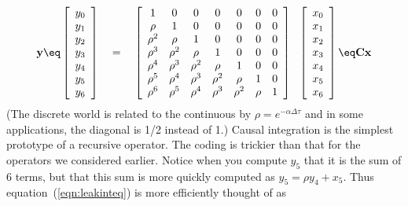 \begin{equation}
\bold y \eq
  \left[
        \begin{array}{c}
                y_0 \\
                y_1 \\
                y_2 \\
                y_3 \\
                y_4 \\
                y_5 \\
                y_6 
        \end{array}
  \right]
 \quad = \quad
  \left[
        \begin{array}{cccccccc}
             1 &     0 &     0 &     0 &     0 &     0 &     0 \\
        \rho   &     1 &     0 &     0 &     0 &     0 &     0 \\
        \rho^2 &\rho   &     1 &     0 &     0 &     0 &     0 \\
        \rho^3 &\rho^2 &\rho   &     1 &     0 &     0 &     0 \\
        \rho^4 &\rho^3 &\rho^2 &\rho   &     1 &     0 &     0 \\
        \rho^5 &\rho^4 &\rho^3 &\rho^2 &\rho   &     1 &     0 \\
        \rho^6 &\rho^5 &\rho^4 &\rho^3 &\rho^2 &\rho   &     1 
        \end{array}
  \right]
  \ \ 
  \left[
        \begin{array}{c}
                x_0 \\
                x_1 \\
                x_2 \\
                x_3 \\
                x_4 \\
                x_5 \\
                x_6 
        \end{array}
  \right]
\eq \bold C \bold x
\label{eqn:leakinteq}
\end{equation}
(The discrete world is related to the continuous by
$ \rho = e^{-\alpha\Delta\tau}$ and in
some applications, the diagonal is 1/2 instead of 1.)
Causal integration is
the simplest prototype of a recursive operator.
The coding is trickier than
that for the operators we considered earlier.
Notice when you compute $y_5$ that it is the sum of 6 terms,
but that this sum is more quickly computed as $y_5 = \rho y_4 + x_5$.
Thus equation~(\ref{eqn:leakinteq}) is more efficiently thought of as
